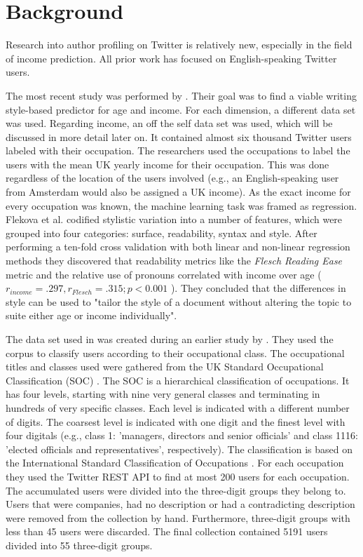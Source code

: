 \documentclass[
10pt, %
a4paper, %
oneside, %
headinclude,footinclude, %
] {book}%
\begin{document}
\chapter{Background}
Research into author profiling on Twitter is relatively new, especially in the field of income prediction. All prior work has focused on English-speaking Twitter users.

The most recent study was performed by \citet{flekova}. Their goal was to find a viable writing style-based predictor for age and income. For each dimension, a different data set was used. 
Regarding income, an off the self data set was used, which will be discussed in more detail later on. It contained almost six thousand Twitter users labeled with their occupation. The researchers used the occupations to label the users with the mean UK yearly income for their occupation. This was done regardless of the location of the users involved (e.g., an English-speaking user from Amsterdam would also be assigned a UK income). 
As the exact income for every occupation was known, the machine learning task was framed as regression. Flekova et al. codified stylistic variation into a number of features, which were grouped into four categories: surface, readability, syntax and style. 
After performing a ten-fold cross validation with both linear and non-linear regression methods they discovered that readability metrics like the \textit{Flesch Reading Ease} metric and the relative use of pronouns correlated with income over age (\(r_{income} = .297,  r_{Flesch} = .315;  p < 0.001 \) ). They concluded that the differences in style can be used to "tailor the style of a document without altering the topic to suite either age or income individually".

The data set used in \citet{flekova} was created during an earlier study by \citet{pietro}. They used the corpus to classify users according to their occupational class. 
The occupational titles and classes used were gathered from the UK Standard Occupational Classification (SOC) \citep{uksoc}. The SOC is a hierarchical classification of occupations. It has four levels, starting with nine very general classes and terminating in hundreds of very specific classes. Each level is indicated with a different number of digits. The coarsest level is indicated with one digit and the finest level with four digitals (e.g., class 1: 'managers, directors and senior officials' and class 1116: 'elected officials and representatives', respectively). The classification is based on the International Standard Classification of Occupations \citep{isco}.
For each occupation they used the Twitter REST API to find at most 200 users for each occupation. The accumulated users were divided into the three-digit groups they belong to. Users that were companies, had no description or had a contradicting description were removed from the collection by hand. Furthermore, three-digit groups with less than 45 users were discarded. The final collection contained 5191 users divided into 55 three-digit groups.
\end{document}
